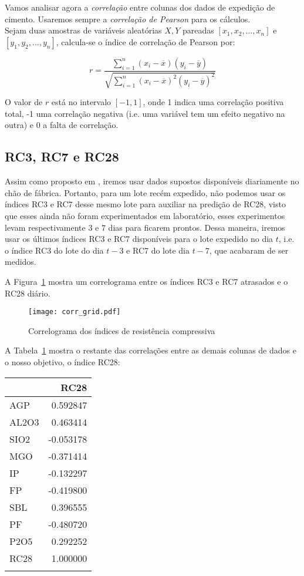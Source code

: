 Vamos analisar agora a \textit{correlação} entre colunas dos dados de expedição
de cimento. Usaremos sempre a \textit{correlação de Pearson} para os cálculos.
\\
Sejam duas amostras de variáveis aleatórias $X,Y$ pareadas $[x_1,x_2, \dots ,
x_n]$ e $[y_1,y_2, \dots , y_n]$, calcula-se o índice de correlação de Pearson por:



\[ r = \frac{{}\sum_{i=1}^{n} (x_i - \overline{x})(y_i - \overline{y})}
{\sqrt{\sum_{i=1}^{n} (x_i - \overline{x})^2(y_i - \overline{y})^2}} \] 


O valor de $r$ está no intervalo $[-1,1]$, onde 1 indica uma correlação positiva
total, -1 uma correlação negativa (i.e. uma variável tem um efeito negativo na
outra) e 0 a falta de correlação.


\subsection{RC3, RC7 e RC28}

Assim como proposto em \cite{grecialin}, iremos usar dados supostos disponíveis diariamente no chão de fábrica. Portanto, para um lote recém expedido,
não podemos usar os índices RC3 e RC7 desse mesmo lote para auxiliar na predição
de RC28, visto que esses ainda não foram experimentados em laboratório, esses
experimentos levam respectivamente 3 e 7 dias para ficarem prontos. Dessa maneira, iremos usar os últimos índices RC3 e RC7 disponíveis para o lote expedido no dia $t$,
i.e. o índice RC3 do lote do dia $t-3$ e RC7 do lote dia $t-7$, que acabaram de ser medidos. 

A Figura~\ref{fig:gridcorr} mostra um correlograma entre os índices RC3 e RC7
atrasados e o RC28 diário. 

\begin{figure}[H]
  \centering
  \texttt{[image: corr\_grid.pdf]}
  \caption{Correlograma dos índices de resistência compressiva}
  \label{fig:gridcorr}
\end{figure}

A Tabela~\ref{tabelacorr} mostra o restante das correlações entre as demais
colunas de dados e o nosso objetivo, o índice RC28:


\begin{table}[H]
  \centering
\begin{tabular}{lr}
  \toprule
  {} &      RC28 \\
  \midrule
  AGP   &  0.592847 \\
  AL2O3 &  0.463414 \\
  SIO2  & -0.053178 \\
  MGO   & -0.371414 \\
  IP    & -0.132297 \\
  FP    & -0.419800 \\
  SBL   &  0.396555 \\
  PF    & -0.480720 \\
  P2O5  &  0.292252 \\
  RC28  &  1.000000 \\
  \bottomrule
  \label{tabelacorr}
\end{tabular}
\end{table}


